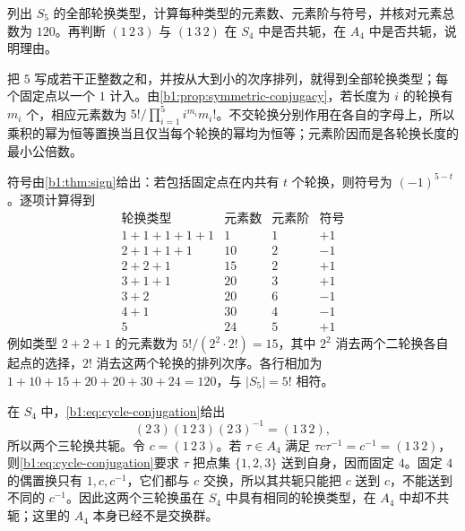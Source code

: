 \begin{exercise}\label{b1:ex:03-symmetric-five-types}
	列出 \(S_5\) 的全部轮换类型，计算每种类型的元素数、元素阶与符号，并核对元素总数为 \(120\)。再判断 \((1\,2\,3)\) 与 \((1\,3\,2)\) 在 \(S_4\) 中是否共轭，在 \(A_4\) 中是否共轭，说明理由。
\end{exercise}
\begin{solution}
	把 \(5\) 写成若干正整数之和，并按从大到小的次序排列，就得到全部轮换类型；每个固定点以一个 \(1\) 计入。由\cref{b1:prop:symmetric-conjugacy}，若长度为 \(i\) 的轮换有 \(m_i\) 个，相应元素数为 \(5!/\prod_{i=1}^5 i^{m_i}m_i!\)。不交轮换分别作用在各自的字母上，所以乘积的幂为恒等置换当且仅当每个轮换的幂均为恒等；元素阶因而是各轮换长度的最小公倍数。

	符号由\cref{b1:thm:sign}给出：若包括固定点在内共有 \(t\) 个轮换，则符号为 \((-1)^{5-t}\)。逐项计算得到
	\[
		\begin{array}{c|r|c|c}
			\text{轮换类型}&\text{元素数}&\text{元素阶}&\text{符号}\\\hline 1+1+1+1+1&1&1&+1\\
			2+1+1+1&10&2&-1\\
			2+2+1&15&2&+1\\
			3+1+1&20&3&+1\\
			3+2&20&6&-1\\
			4+1&30&4&-1\\
			5&24&5&+1
		\end{array}
	\]
	例如类型 \(2+2+1\) 的元素数为 \(5!/(2^2\cdot2!)=15\)，其中 \(2^2\) 消去两个二轮换各自起点的选择，\(2!\) 消去这两个轮换的排列次序。各行相加为 \(1+10+15+20+20+30+24=120\)，与 \(\lvert S_5\rvert=5!\) 相符。

	在 \(S_4\) 中，\eqref{b1:eq:cycle-conjugation}给出
	\[
		(2\,3)(1\,2\,3)(2\,3)^{-1}=(1\,3\,2),
	\]
	所以两个三轮换共轭。令 \(c=(1\,2\,3)\)。若 \(\tau\in A_4\) 满足 \(\tau c\tau^{-1}=c^{-1}=(1\,3\,2)\)，则\eqref{b1:eq:cycle-conjugation}要求 \(\tau\) 把点集 \(\{1,2,3\}\) 送到自身，因而固定 \(4\)。固定 \(4\) 的偶置换只有 \(1,c,c^{-1}\)，它们都与 \(c\) 交换，所以其共轭只能把 \(c\) 送到 \(c\)，不能送到不同的 \(c^{-1}\)。因此这两个三轮换虽在 \(S_4\) 中具有相同的轮换类型，在 \(A_4\) 中却不共轭；这里的 \(A_4\) 本身已经不是交换群。
\end{solution}

